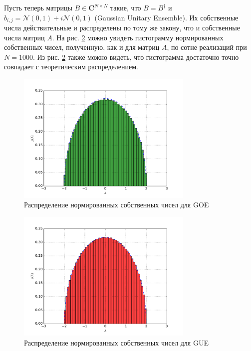 \documentclass[a4paper]{article}
\begin{document}
Пусть теперь матрицы \(B\in \mathbf{C}^{N\times N}\) такие, что \(B=B^\dag\) и
\(b_{i,j} = \mathcal{N}(0,1) + i\mathcal{N}(0,1)\) (Gaussian Unitary Ensemble).
Их собственные числа действительные и распределены по тому же закону, что и собственные числа матриц \(A\).
На рис. \ref{fig:gue_eig} можно увидеть гистограмму нормированных собственных чисел,
полученную, как и для матриц \(A\), по сотне реализаций при \(N=1000\). Из рис.
\ref{fig:gue_eig} также можно видеть, что гистограмма достаточно точно совпадает с
теоретическим распределением.
\begin{figure}
	\center
	\includegraphics[width=0.75\textwidth]{../pictures/lab4_goe_eig_hist.pdf}
	\caption{Распределение нормированных собственных чисел для GOE}
	\label{fig:goe_eig}
\end{figure}
\begin{figure}
	\center
	\includegraphics[width=0.75\textwidth]{../pictures/lab4_gue_eig_hist.pdf}
	\caption{Распределение нормированных собственных чисел для GUE}
	\label{fig:gue_eig}
\end{figure}
\end{document}
